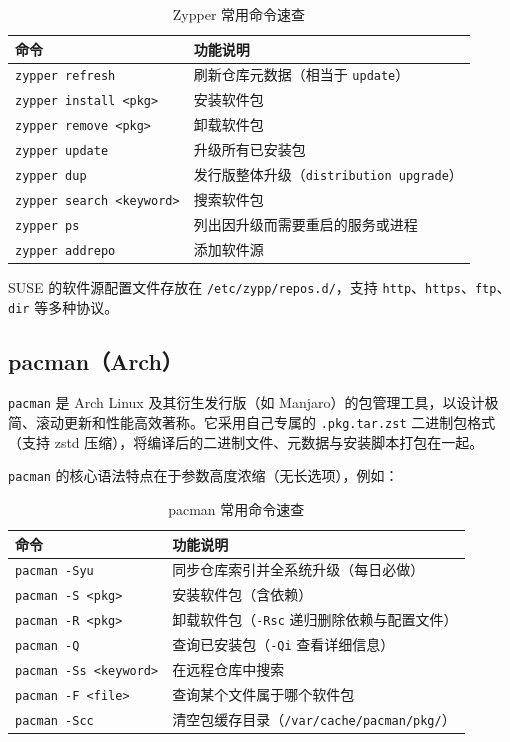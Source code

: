 \documentclass[12pt,UTF8]{ctexbook}
\begin{document}
\begin{table}[htbp]
	\centering
	\caption{Zypper 常用命令速查}
	\begin{tabular}{@{}ll@{}}
		\toprule
		\textbf{命令} & \textbf{功能说明} \\
		\midrule
		\verb|zypper refresh| & 刷新仓库元数据（相当于 \verb|update|） \\
		\verb|zypper install <pkg>| & 安装软件包 \\
		\verb|zypper remove <pkg>| & 卸载软件包 \\
		\verb|zypper update| & 升级所有已安装包 \\
		\verb|zypper dup| & 发行版整体升级（\verb|distribution upgrade|） \\
		\verb|zypper search <keyword>| & 搜索软件包 \\
		\verb|zypper ps| & 列出因升级而需要重启的服务或进程 \\
		\verb|zypper addrepo| & 添加软件源 \\
		\bottomrule
	\end{tabular}
\end{table}

SUSE 的软件源配置文件存放在 \texttt{/etc/zypp/repos.d/}，支持 \texttt{http}、\texttt{https}、\texttt{ftp}、\texttt{dir} 等多种协议。

\subsection{pacman（Arch）}

\texttt{pacman} 是 Arch Linux 及其衍生发行版（如 Manjaro）的包管理工具，以设计极简、滚动更新和性能高效著称。它采用自己专属的 \texttt{.pkg.tar.zst} 二进制包格式（支持 zstd 压缩），将编译后的二进制文件、元数据与安装脚本打包在一起。

\texttt{pacman} 的核心语法特点在于参数高度浓缩（无长选项），例如：

\begin{table}[htbp]
	\centering
	\caption{pacman 常用命令速查}
	\begin{tabular}{@{}ll@{}}
		\toprule
		\textbf{命令} & \textbf{功能说明} \\
		\midrule
		\verb|pacman -Syu| & 同步仓库索引并全系统升级（每日必做） \\
		\verb|pacman -S <pkg>| & 安装软件包（含依赖） \\
		\verb|pacman -R <pkg>| & 卸载软件包（\verb|-Rsc| 递归删除依赖与配置文件） \\
		\verb|pacman -Q| & 查询已安装包（\verb|-Qi| 查看详细信息） \\
		\verb|pacman -Ss <keyword>| & 在远程仓库中搜索 \\
		\verb|pacman -F <file>| & 查询某个文件属于哪个软件包 \\
		\verb|pacman -Scc| & 清空包缓存目录（\texttt{/var/cache/pacman/pkg/}） \\
		\bottomrule
	\end{tabular}
\end{table}
\end{document}
